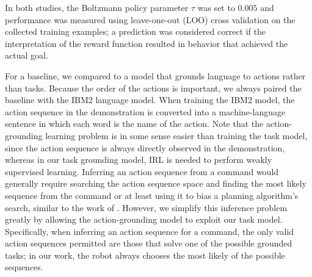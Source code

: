 \documentclass[conference]{IEEEtran}
\begin{document}
In both studies, the Boltzmann policy parameter $\tau$ was set to $0.005$ and performance was measured using leave-one-out (LOO) cross validation on the collected training examples; a prediction was considered correct if the interpretation of the reward function resulted in behavior that achieved the actual goal. 

For a baseline, we compared to a model that grounds language to actions rather than tasks. Because the order of the actions is important, we always paired the baseline with the IBM2 language model. When training the IBM2 model, the action sequence in the demonstration is converted into a machine-language sentence in which each word is the name of the action. Note that the action-grounding learning problem is in some sense easier than training the task model, since the action sequence is always directly observed in the demonstration, whereas in our task grounding model, IRL is needed to perform weakly supervised learning. Inferring an action sequence from a command would generally require searching the action sequence space and finding the most likely sequence from the command or at least using it to bias a planning algorithm's search, similar to the work of \citet{chen11}. However, we simplify this inference problem greatly by allowing the action-grounding model to exploit our task model. Specifically, when inferring an action sequence for a command, the only valid action sequences permitted are those that solve one of the possible grounded tasks; in our work, the robot always chooses the most likely of the possible sequences.
\end{document}
